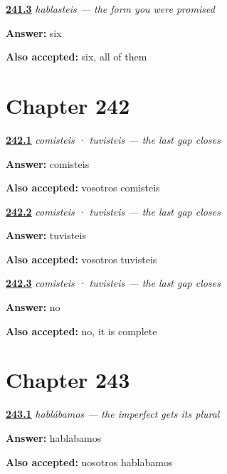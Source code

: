 \noindent\begin{minipage}[t]{\linewidth}
\raggedright
\hyperlink{review-ES-C63-hablasteis-whole}{\textbf{241.3}} \emph{hablasteis — the form you were promised}\par
\small \textbf{Answer:} six\par
\footnotesize \textbf{Also accepted:} six, all of them
\end{minipage}\par\medskip

\section*{Chapter 242}

\noindent\begin{minipage}[t]{\linewidth}
\raggedright
\hyperlink{review-ES-C63-comisteis-er}{\textbf{242.1}} \emph{comisteis · tuvisteis — the last gap closes}\par
\small \textbf{Answer:} comisteis\par
\footnotesize \textbf{Also accepted:} vosotros comisteis
\end{minipage}\par\medskip

\noindent\begin{minipage}[t]{\linewidth}
\raggedright
\hyperlink{review-ES-C63-comisteis-strong}{\textbf{242.2}} \emph{comisteis · tuvisteis — the last gap closes}\par
\small \textbf{Answer:} tuvisteis\par
\footnotesize \textbf{Also accepted:} vosotros tuvisteis
\end{minipage}\par\medskip

\noindent\begin{minipage}[t]{\linewidth}
\raggedright
\hyperlink{review-ES-C63-comisteis-done}{\textbf{242.3}} \emph{comisteis · tuvisteis — the last gap closes}\par
\small \textbf{Answer:} no\par
\footnotesize \textbf{Also accepted:} no, it is complete
\end{minipage}\par\medskip

\section*{Chapter 243}

\noindent\begin{minipage}[t]{\linewidth}
\raggedright
\hyperlink{review-ES-C63-hablabamos-we}{\textbf{243.1}} \emph{hablábamos — the imperfect gets its plural}\par
\small \textbf{Answer:} hablabamos\par
\footnotesize \textbf{Also accepted:} nosotros hablabamos
\end{minipage}\par\medskip

